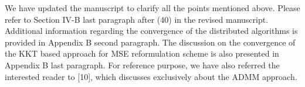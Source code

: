 \begin{enumerate}
\begin{itemize}
\end{itemize}

We have updated the manuscript to clarify all the points mentioned above. Please refer to Section IV-B last paragraph after (40) in the revised manuscript. Additional information regarding the convergence of the distributed algorithms is provided in Appendix B second paragraph. The discussion on the convergence of the KKT based approach for MSE reformulation scheme is also presented in Appendix B last paragraph. For reference purpose, we have also referred the interested reader to [10], which discusses exclusively about the ADMM approach.

\begin{comment}
\resp We thank the reviewer for raising the concern regarding the convergence of the distributed algorithms with limited number of iterations. In view of this, we have updated the manuscript to include discussions on the convergence of the distributed algorithms with a limited number of iterations in the third paragraph of Appendix B after (57). Since the monotonicity of the algorithm with limited number of updates in each subproblem is not guaranteed in each iteration, it is hard to prove the convergence of the overall algorithm. However, if the algorithm is allowed to converge or iterated enough to guarantee the strict monotonicity of the objective in between the \ac{SCA} updates, the global convergence of the algorithm to a limit point of the original nonconvex problem is guaranteed based on the discussions provided in Appendix A.
\begin{itemize}
\item If there exists a fixed point or a set of fixed points for the original nonconvex problem in (16), then the proposed centralized algorithm in Section III-B and III-C finds at least one such point if iterated until convergence, which is provided in Appendix A. In order to find a unique fixed point, we regularize the objective function in (16) with a quadratic penalty term as discussed in Appendix A to transform the objective as a strongly convex function.
\item If the distributed algorithm is carried out for a limited number of iterations, it is not guaranteed to achieve a fixed point even if the outer \ac{SCA} update is performed for a large number of iterations. By this approach, the distributed approaches are not guaranteed to converge to a stationary point. In all our simulations on the primal and the \ac{ADMM} approach, we have set \eqn{J_{\max} = 20} in order to guarantee the monotonicity of the objective.

\end{comment}
\end{enumerate}
